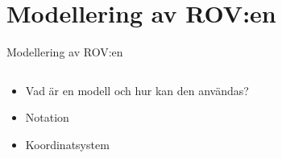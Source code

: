 \documentclass[11pt,aspectratio=169]{beamer}
\begin{document}
\section{Modellering av ROV:en}
\begin{frame}{Modellering av ROV:en}
\begin{columns}
\begin{column}{0.5\textwidth}
\begin{itemize}
\item {} {Vad är en modell och hur kan den användas?}
\item {} {Notation}
\item {} {Koordinatsystem}
\end{itemize}
\end{column}
\newcommand*{\coordinateRadius}{0.05}
\newcommand*{\coordRot}{30}
\begin{column}{0.5\textwidth}
\end{column}
\end{columns}
\end{frame}
\end{document}
